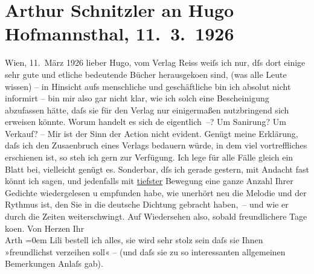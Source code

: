 

         
         \renewcommand{\erwaehntePersonen}{Personen: Hugo von Hofmannsthal, Lili Schnitzler}
         \renewcommand{\erwaehnteInstitutionen}{Institutionen: Erich-Reiss-Verlag}
         \renewcommand{\erwaehnteOrte}{Orte: Wien}
         \renewcommand{\erwaehnteWerke}{}
               \section[Arthur Schnitzler an Hugo Hofmannsthal, 11. 3. 1926]{ Arthur Schnitzler an Hugo Hofmannsthal, 11. 3. 1926}\nopagebreak{}\rehead{ }\begin{ledgroupsized}[t]{13cm}\normalsize\beginnumbering \toendnotes[C]{\smallbreak\pagebreak[2]} 
\pstart
           \raggedleft{}{\pb}Wien, 11. März 1926\pend
           \pstart
           lieber Hugo, vom Verlag Reiss
               weiſs ich nur, dſs dort einige sehr gute und etliche bedeutende Bücher herausgeko{\geminationm}en sind, (was alle Leute wissen) – \introOben{}in Hinsicht aufs\introOben{} menschliche und geschäftliche bin ich absolut nicht
               informirt – bin mir also gar nicht klar, wie ich solch eine Bescheinigung abzufassen
               hätte, daſs sie für den Verlag nur einigermaßen nutzbringend sich erweisen könnte.
               Worum handelt es sich de{\geminationn} eigentlich –? Um Sanirung? Um
               Verkauf? – Mir ist der Sinn der Action nicht evident. Genügt meine Erklärung, daſs
               ich den Zusa{\geminationm}enbruch eines Verlags bedauern würde, in
               dem viel vortreffliches erschienen ist, so steh ich gern zur Verfügung. Ich lege für
               alle Fälle gleich ein Blatt bei, vielleicht genügt es.\pend
           \pstart
           {\pb}Sonderbar, dſs ich gerade gestern, mit Andacht fast
               könnt ich sagen, und jedenfalls mit \uline{tiefster} Bewegung
               eine ganze Anzahl Ihrer Gedichte \introOben{}wieder\introOben{}gelesen u empfunden
               habe, wie unerhört neu die Melodie und der Rythmus ist, den Sie in die deutsche
               Dichtung gebracht haben, – und wie er durch die Zeiten weiterschwingt.\pend
           \pstart
           Auf Wiedersehen also, sobald freundlichere Tage ko{\geminationm}en.\pend
           \pstart
           Von Herzen Ihr{\\[\baselineskip]}\spacefill\mbox{Arth}\pend
           \leftskip=0em{}\pstart
           \noindent{}Lili bestell ich alles, sie wird sehr stolz
                  sein daſs sie Ihnen »freundlichst verzeihen soll« – (und daſs sie zu so
                  interessanten allgemeinen Bemerkungen Anlaſs gab).\pend
           

\end{ledgroupsized}
